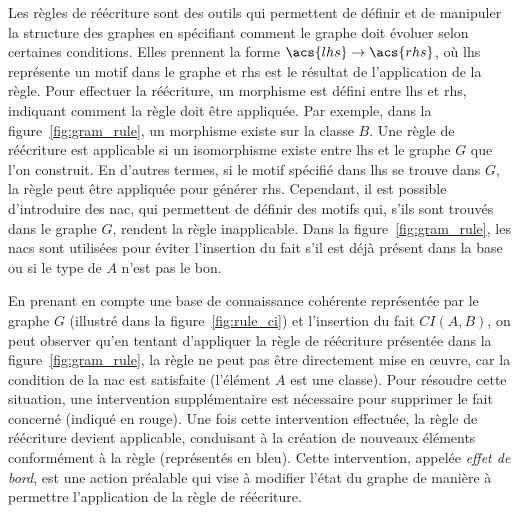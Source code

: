 Les règles de réécriture sont des outils qui permettent de définir et de manipuler la structure des graphes en spécifiant comment le graphe doit évoluer selon certaines conditions.
Elles prennent la forme $\acs{lhs} \to \acs{rhs}$, où \gls{lhs} représente un motif dans le graphe et \gls{rhs} est le résultat de l'application de la règle.
Pour effectuer la réécriture, un morphisme est défini entre \gls{lhs} et \gls{rhs}, indiquant comment la règle doit être appliquée.
Par exemple, dans la figure~\ref{fig:gram_rule}, un morphisme existe sur la classe $B$.
Une règle de réécriture est applicable si un isomorphisme existe entre \gls{lhs} et le graphe $G$ que l'on construit.
En d'autres termes, si le motif spécifié dans \gls{lhs} se trouve dans $G$, la règle peut être appliquée pour générer \gls{rhs}.
Cependant, il est possible d'introduire des \gls{nac}, qui permettent de définir des motifs qui, s'ils sont trouvés dans le graphe $G$, rendent la règle inapplicable.
Dans la figure~\ref{fig:gram_rule}, les \gls{nac}s sont utilisées pour éviter l'insertion du fait s'il est déjà présent dans la base ou si le type de $A$ n'est pas le bon.

\begin{example}
    En prenant en compte une base de connaissance cohérente représentée par le graphe $G$ (illustré dans la figure~\ref{fig:rule_ci}) et l'insertion du fait $CI(A, B)$, on peut observer qu'en tentant d'appliquer la règle de réécriture présentée dans la figure~\ref{fig:gram_rule}, la règle ne peut pas être directement mise en œuvre, car la condition de la \gls{nac} est satisfaite (l'élément $A$ est une classe).
    Pour résoudre cette situation, une intervention supplémentaire est nécessaire pour supprimer le fait concerné (indiqué en rouge).
    Une fois cette intervention effectuée, la règle de réécriture devient applicable, conduisant à la création de nouveaux éléments conformément à la règle (représentés en bleu).
    Cette intervention, appelée \emph{effet de bord}, est une action préalable qui vise à modifier l'état du graphe de manière à permettre l'application de la règle de réécriture.
\end{example}

